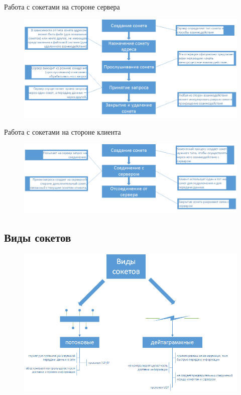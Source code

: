 \documentclass{beamer}
\begin{document}
\begin{frame}{Работа с сокетами на стороне сервера}
	\begin{figure}[h]
		\centering
	\includegraphics[scale=0.45]{images/lec12-pic02.png}
	\end{figure}
\end{frame}

\begin{frame}{Работа с сокетами на стороне клиента}
	\begin{figure}[h]
		\centering
	\includegraphics[scale=0.45]{images/lec12-pic03.png}
	\end{figure}
\end{frame}

\subsection{Виды сокетов}

\begin{frame}
	\begin{figure}[h]
		\centering
	\includegraphics[scale=0.5]{images/lec12-pic04.png}
	\end{figure}
\end{frame}
\end{document}
